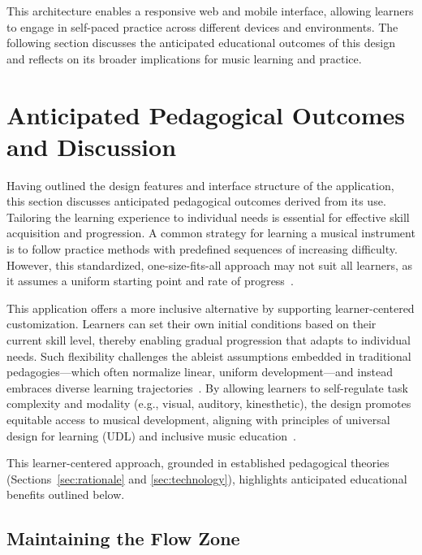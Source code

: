 \documentclass[runningheads]{llncs}
\begin{document}
This architecture enables a responsive web and mobile interface, allowing learners to engage in self-paced practice across different devices and environments. The following section discusses the anticipated educational outcomes of this design and reflects on its broader implications for music learning and practice.


\section{Anticipated Pedagogical Outcomes and Discussion}
\label{sec:results}

Having outlined the design features and interface structure of the application, this section discusses anticipated pedagogical outcomes derived from its use. Tailoring the learning experience to individual needs is essential for effective skill acquisition and progression. A common strategy for learning a musical instrument is to follow practice methods with predefined sequences of increasing difficulty. However, this standardized, one-size-fits-all approach may not suit all learners, as it assumes a uniform starting point and rate of progress~\cite{Steen23}.

This application offers a more inclusive alternative by supporting learner-centered customization. Learners can set their own initial conditions based on their current skill level, thereby enabling gradual progression that adapts to individual needs. Such flexibility challenges the ableist assumptions embedded in traditional pedagogies---which often normalize linear, uniform development---and instead embraces diverse learning trajectories~\cite{Dolmage17,Hehir02}. By allowing learners to self-regulate task complexity and modality (e.g., visual, auditory, kinesthetic), the design promotes equitable access to musical development, aligning with principles of universal design for learning (UDL) and inclusive music education~\cite{Katz13,Jellison15}.

This learner-centered approach, grounded in established pedagogical theories (Sections~\ref{sec:rationale} and \ref{sec:technology}), highlights anticipated educational benefits outlined below.


\subsection{Maintaining the Flow Zone}
\label{sec:flow_zone}
\end{document}
